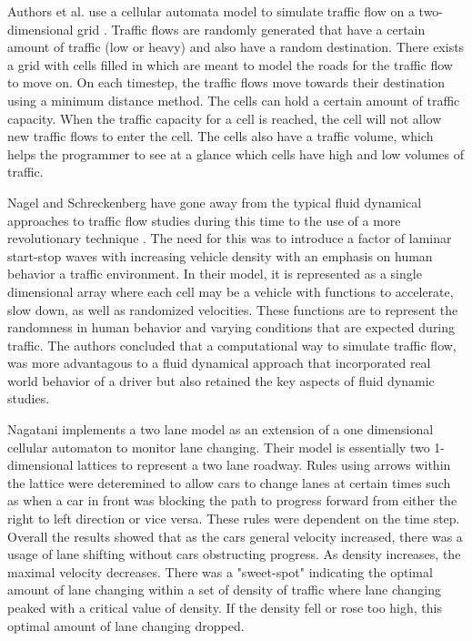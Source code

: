 \documentclass[sigplan,screen]{acmart}
\begin{document}
Authors et al. use a cellular automata model to simulate traffic flow on a
two-dimensional grid \cite{pang_simulation_2019}. Traffic flows are randomly
generated that have a certain amount of traffic (low or heavy) and also have a
random destination. There exists a grid with cells filled in which are meant to
model the roads for the traffic flow to move on. On each timestep, the traffic
flows move towards their destination using a minimum distance method. The cells
can hold a certain amount of traffic capacity. When the traffic capacity for a
cell is reached, the cell will not allow new traffic flows to enter the cell.
The cells also have a traffic volume, which helps the programmer to see at a
glance which cells have high and low volumes of traffic.

          
Nagel and Schreckenberg have gone away from the typical fluid dynamical
approaches to traffic flow studies during this time to the use of a more
revolutionary technique \cite{nagel_cellular_1992}. The need for this was to
introduce a factor of laminar start-stop waves with increasing vehicle density
with an emphasis on human behavior a traffic environment. In their model, it is
represented as a single dimensional array where each cell may be a vehicle with
functions to accelerate, slow down, as well as randomized velocities. These
functions are to represent the randomness in human behavior and varying
conditions that are expected during traffic. The authors concluded that a
computational way to simulate traffic flow, was more advantagous to a fluid
dynamical approach that incorporated real world behavior of a driver but also
retained the key aspects of fluid dynamic studies.


Nagatani implements a two lane model as an extension of a one dimensional
cellular automaton to monitor lane changing.
\cite{nagatani_self-organization_1993} Their model is essentially two
1-dimensional lattices to represent a two lane roadway. Rules using arrows
within the lattice were deteremined to allow cars to change lanes at certain
times such as when a car in front was blocking the path to progress forward from
either the right to left direction or vice versa. These rules were dependent on
the time step. Overall the results showed that as the cars general velocity
increased, there was a usage of lane shifting without cars obstructing progress.
As density increases, the maximal velocity decreases. There was a "sweet-spot"
indicating the optimal amount of lane changing within a set of density of
traffic where lane changing peaked with a critical value of density. If the
density fell or rose too high, this optimal amount of lane changing dropped.
\end{document}
